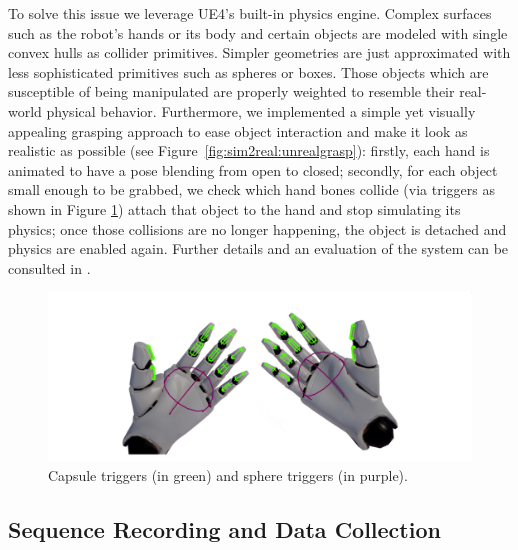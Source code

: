 To solve this issue we leverage UE4's built-in physics engine. Complex surfaces such as the robot's hands or its body and certain objects are modeled with single convex hulls as collider primitives. Simpler geometries are just approximated with less sophisticated primitives such as spheres or boxes. Those objects which are susceptible of being manipulated are properly weighted to resemble their real-world physical behavior. Furthermore, we implemented a simple yet visually appealing grasping approach to ease object interaction and make it look as realistic as possible (see Figure~\ref{fig:sim2real:unrealgrasp}): firstly, each hand is animated to have a pose blending from open to closed; secondly, for each object small enough to be grabbed, we check which hand bones collide (via triggers as shown in Figure \ref{fig:sim2real:triggers}) attach that object to the hand and stop simulating its physics; once those collisions are no longer happening, the object is detached and physics are enabled again. Further details and an evaluation of the system can be consulted in \cite{Oprea2019}.

\begin{figure}[!htb]
    \centering
    \includegraphics[width=0.8\linewidth]{Figures/Sim2Real/capsuletriggers}
    \caption{Capsule triggers (in green) and sphere triggers (in purple).}
    \label{fig:sim2real:triggers}
\end{figure}

\clearpage

\subsection{Sequence Recording and Data Collection}

